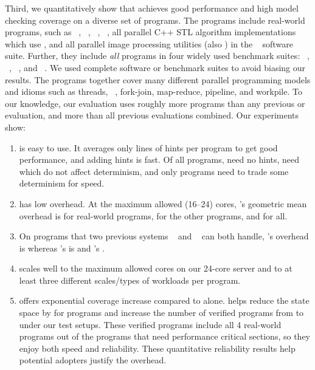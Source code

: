 Third, we quantitatively show that \parrot achieves good performance and high
model checking coverage on a diverse set of \nprog programs.  The programs
include \nrealprog real-world programs, such as \bdb~\cite{berkeleydb},
\openldap~\cite{openldap}, \redis~\cite{redis}, \mplayer~\cite{mplayer},
all \nstl parallel C++ STL algorithm 
implementations~\cite{parallel-stl} which use \openmp, and all \nimagick
parallel image processing utilities (also \openmp) in the
\imagick~\cite{imagick}
software suite.  Further, they
include \emph{all} \nbenchmarks programs in four widely used benchmark suites:
\parsec~\cite{parsec}, \phoenix~\cite{phoenix-benchmarks},
\splashx~\cite{splashx},
and \npb~\cite{npb}.  We used complete software or benchmark suites to
avoid biasing our results. The programs together cover many different
parallel programming models and idioms such as threads,
\openmp~\cite{openmp}, fork-join, map-reduce, pipeline, and workpile.  To
our knowledge, our
evaluation uses roughly \overeach more programs than any previous
\dmt or \smt evaluation, and \overcombined more than all
previous evaluations combined.
Our experiments show:
\begin{enumerate}

\item \parrot is easy to use. It averages only \hintsperprog lines of hints
  per program to get good performance, and adding hints is fast.  Of all
  \nprog programs, \nprognohints need no hints, \nproglineuphints need
  \computes which do not affect determinism, and only \nprognondethints
  programs need \nondets to trade some determinism for speed.

\item \parrot has low overhead.  At the maximum allowed (16--24) cores,
\parrot's
  geometric mean overhead is \meanrealoverhead for \nrealprog real-world
programs,
  \meanbenchoverhead for the other \nbenchmarks programs, and \meanoverhead for
all.

\item On \nprogcompared programs that two previous systems
\dthreads~\cite{dthreads:sosp11}
  and \coredet~\cite{coredet:asplos10} can both handle, \parrot's overhead is
\parrotcompoverhead whereas \dthreads's
  is \dthreadssyncoverhead and \coredet's \coredetoverhead.

\item \parrot scales well to the maximum allowed cores on our 24-core server and
  to at least three different scales/types of workloads per program.

\item \ecosys offers exponential coverage increase compared to \dbug alone.
  \parrot helps \dbug reduce the state space by \shrinkscale for
  \nprogshrink programs and increase the number of verified programs from
  \nprogverifieddbug to \nprogverifiedxxx under our test setups.
  These verified programs include all 4 real-world programs out of
  the \nprognondethints programs that need performance critical sections, so
they
  enjoy both speed and reliability.
  These quantitative reliability results help potential \parrot adopters justify
  the overhead.

\end{enumerate}

